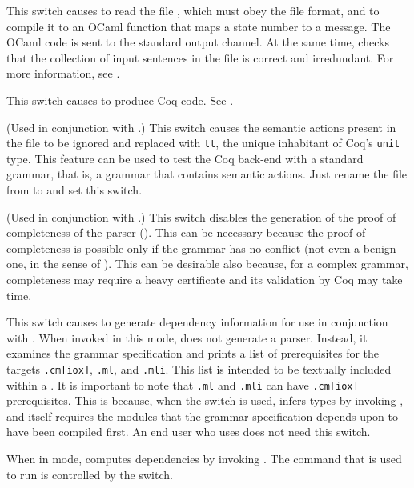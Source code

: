\documentclass[onecolumn,11pt,nocopyrightspace,preprint]{sigplanconf}
\begin{document}
 This switch causes \menhir to read the
file , which must obey the \messages file format, and to compile
it to an OCaml function that maps a state number to a message. The OCaml code
is sent to the standard output channel. At the same time, \menhir checks that
the collection of input sentences in the file  is correct and
irredundant. For more information, see .

\docswitch{\ocoq} This switch causes \menhir to produce Coq code. See .

\docswitch{\ocoqnoactions} (Used in conjunction with \ocoq.) This switch
causes the semantic actions present in the \vy file to be ignored and
replaced with \verb+tt+, the unique inhabitant of Coq's \verb+unit+ type. This
feature can be used to test the Coq back-end with a standard grammar, that is, a
grammar that contains \ocaml semantic actions. Just rename the file from
\mly to \vy and set this switch.

\docswitch{\ocoqnocomplete} (Used in conjunction with \ocoq.) This switch
disables the generation of the proof of completeness of the parser
(). This can be necessary because the proof of completeness is
possible only if the grammar has no conflict (not even a benign one, in the
sense of ). This can be desirable also because, for
a complex grammar, completeness may require a heavy certificate and its
validation by Coq may take time.

\docswitch{\odepend} This switch causes \menhir to generate dependency information
for use in conjunction with \make. When invoked in this mode, \menhir does not
generate a parser. Instead, it examines the grammar specification and prints a
list of prerequisites for the targets \texttt{.cm[iox]},
\texttt{.ml}, and \texttt{.mli}. This list is intended
to be textually included within a \Makefile. It is important to note that
\texttt{.ml} and \texttt{.mli} can have
\texttt{.cm[iox]} prerequisites. This is because, when the \oinfer switch
is used, \menhir infers types by invoking \ocamlc, and \ocamlc itself requires
the \ocaml modules that the grammar specification depends upon to have been
compiled first.
An end user who uses \ocamlbuild does not need this switch.

When in \odepend mode, \menhir computes dependencies by invoking \ocamldep.
The command that is used to run \ocamldep is controlled by the \oocamldep
switch.
\end{document}
